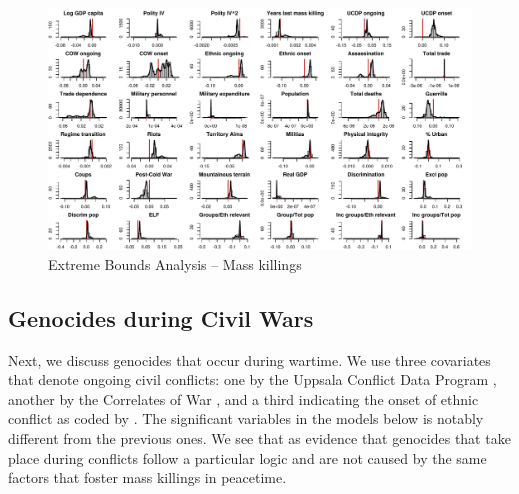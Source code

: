 \clearpage
\begin{figure}
    \centering
    \includegraphics[width=\textwidth]{images/mk.pdf}
    \caption{Extreme Bounds Analysis -- Mass killings}
    \label{fig:mk}
\end{figure}
\clearpage

\subsection{Genocides during Civil Wars}
\label{sec:civil-wars}

Next, we discuss genocides that occur during wartime. We use three covariates that denote ongoing civil conflicts: one by the Uppsala Conflict Data Program \citep{allansson2017organized,gleditsch2002armed}, another by the Correlates of War \citep{sarkees2010resort}, and a third indicating the onset of ethnic conflict as coded by \citet{cederman2010ethnic}. The significant variables in the models below is notably different from the previous ones. We see that as evidence that genocides that take place during conflicts follow a particular logic and are not caused by the same factors that foster mass killings in peacetime. 

\vspace{1cm}

